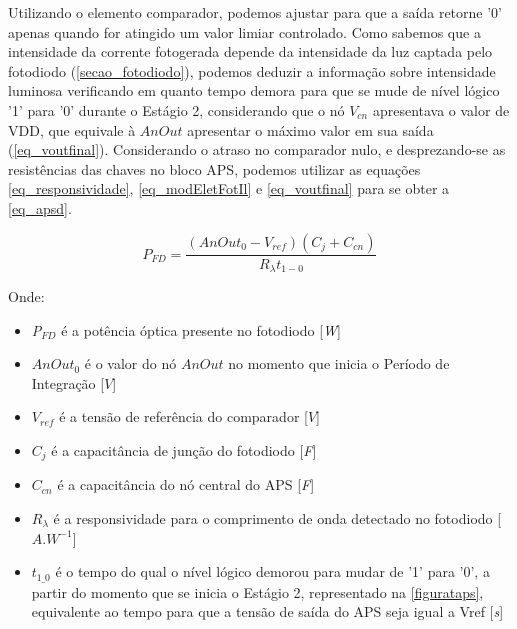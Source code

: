 Utilizando o elemento comparador, podemos ajustar para que a sa\'ida retorne '0' apenas quando for atingido um valor limiar controlado. Como sabemos que a intensidade da corrente fotogerada depende da intensidade da luz captada pelo fotodiodo (\autoref{secao_fotodiodo}), podemos deduzir a informação sobre intensidade luminosa verificando em quanto tempo demora para que se mude de n\'ivel l\'ogico '1' para '0' durante o Est\'agio 2, considerando que o nó $V_{cn}$ apresentava o valor de VDD, que equivale à $AnOut$ apresentar o máximo valor em sua saída (\autoref{eq_voutfinal}). Considerando o atraso no comparador nulo, e desprezando-se as resistências das chaves no bloco APS, podemos utilizar as equações \ref{eq_responsividade}, \ref{eq_modEletFotIl} e \ref{eq_voutfinal} para se obter a \autoref{eq_apsd}.

\begin{equation}
    \label{eq_apsd}
    P_{FD} = \frac{(AnOut_0-V_{ref})(C_{j}+C_{cn})}{R_{\lambda}t_{1-0}}
\end{equation}

Onde:

\begin{itemize}

    \item \textit{P$_{FD}$} \'e a pot\^encia \'optica presente no fotodiodo [\textit{W}]
    \item $AnOut_0$ \'e o valor do nó $AnOut$ no momento que inicia o Período de Integração [$V$]
    \item \textit{$V_{ref}$} \'e a tensão de refer\^encia do comparador [$V$]
    \item \textit{$C_j$} \'e a capacit\^ancia de junção do fotodiodo [\textit{F}]
    \item \textit{$C_{cn}$} \'e a capacit\^ancia do n\'o central do APS [\textit{F}]
    \item $R_{\lambda}$ \'e a responsividade para o comprimento de onda detectado no fotodiodo [$A.W^{-1}$]
    \item $t_{1\_0}$ \'e o tempo do qual o n\'ivel l\'ogico demorou para mudar de '1' para '0', a partir do momento que se inicia o Estágio 2, representado na \autoref{figurataps}, equivalente ao tempo para que a tensão de saída do APS seja igual a Vref [\textit{s}]
    
\end{itemize}

